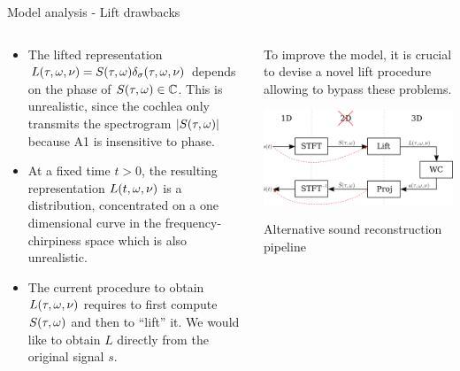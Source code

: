 \documentclass[10pt,american,ignorenonframetext,aspectratio=1610]{beamer}
\providecommand{\tightlist}{%
  \setlength{\itemsep}{0pt}\setlength{\parskip}{0pt}}
\theoremstyle{remark}
\begin{document}
\begin{frame}{Model analysis - Lift drawbacks}
\protect\hypertarget{model-analysis---lift-drawbacks}{}

\begin{columns}[T]
\begin{column}{0.5\textwidth}
\begin{itemize}
\tightlist
\item
  The lifted representation
  \(L(\tau,\omega,\nu)=S(\tau,\omega)\delta_\sigma(\tau,\omega,\nu)\) depends on the
  phase of \(S(\tau,\omega)\in\mathbb{C}\). This is unrealistic, since the cochlea
  only transmits the spectrogram \(\left\lvert S(\tau,\omega)\right\rvert\) because A1 is
  insensitive to phase.
\item
  At a fixed time \(t>0\), the resulting representation \(L(t,\omega,\nu)\)
  is a distribution, concentrated on a one dimensional curve in the
  frequency-chirpiness space which is also unrealistic.
\item
  The current procedure to obtain \(L(\tau,\omega,\nu)\) requires to first
  compute \(S(\tau,\omega)\) and then to ``lift'' it. We would like to
  obtain \(L\) directly from the original signal \(s\).
\end{itemize}
\end{column}

\begin{column}{0.5\textwidth}
To improve the model, it is crucial to devise a novel lift procedure
allowing to bypass these problems.

\includegraphics[width=1\textwidth,height=\textheight]{img/new_pipeline.png}

Alternative sound reconstruction pipeline
\end{column}
\end{columns}

\end{frame}
\end{document}

